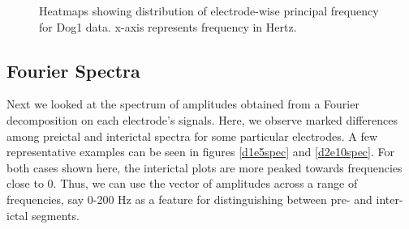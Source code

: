 \documentclass[a4paper]{article}
\begin{document}
\begin{figure}[H]
	\centering
	\qquad
	\caption{Heatmaps showing distribution of electrode-wise principal frequency for Dog1 data. x-axis represents frequency in Hertz.}
	\label{d1freq}
\end{figure}

\subsection{Fourier Spectra}
\label{spec}
Next we looked at the spectrum of amplitudes obtained from a Fourier decomposition on each electrode's signals. Here, we observe marked differences among preictal and interictal spectra for some particular electrodes. A few representative examples can be seen in figures \ref{d1e5spec} and \ref{d2e10spec}. For both cases shown here, the interictal plots are more peaked towards frequencies close to 0. Thus, we can use the vector of amplitudes across a range of frequencies, say 0-200 Hz as a feature for distinguishing between pre- and inter-ictal segments. 
\end{document}
